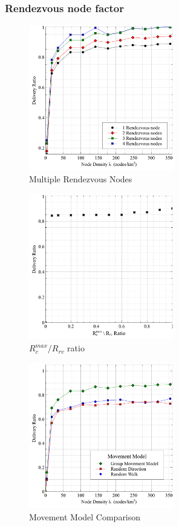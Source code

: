 \documentclass[conference]{IEEEtran}
\begin{document}
\subsubsection{Rendezvous node factor}
\begin{figure}[!t]
	\centering
	\includegraphics[width=2.5in]{Graphs/MultipleRVs.pdf}
	\caption{Multiple Rendezvous Nodes}
	\label{Multiple Rendezvous Nodes}
\end{figure}
\begin{figure}[!t]
\centering
\includegraphics[width=2.5in]{Graphs/RcmaxRrv.pdf}
\caption{$R_c^{max}/R_{rv}$ ratio}
\label{$R_c^{max}/R_{rv}$ ratio}
\end{figure}

\begin{figure}[!t]
\centering
\includegraphics[width=2.5in]{Graphs/movement.pdf}
\caption{Movement Model Comparison}
\label{Movement Model Comparison}
\end{figure}
\end{document}
